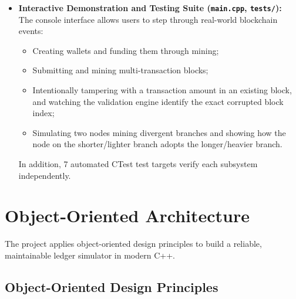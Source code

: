 \documentclass[11pt,a4paper]{report}
\begin{document}
\begin{itemize}
    \item \textbf{Interactive Demonstration and Testing Suite (\texttt{main.cpp}, \texttt{tests/}):}\\
    The console interface allows users to step through real-world blockchain events:
    \begin{itemize}
        \item Creating wallets and funding them through mining;
        \item Submitting and mining multi-transaction blocks;
        \item Intentionally tampering with a transaction amount in an existing block, and watching the validation engine identify the exact corrupted block index;
        \item Simulating two nodes mining divergent branches and showing how the node on the shorter/lighter branch adopts the longer/heavier branch.
    \end{itemize}
    In addition, 7 automated CTest test targets verify each subsystem independently.
\end{itemize}

\clearpage

\section{Object-Oriented Architecture}

The project applies object-oriented design principles to build a reliable, maintainable ledger simulator in modern C++.

\subsection{Object-Oriented Design Principles}
\end{document}
